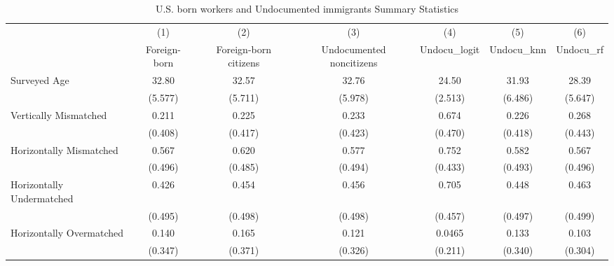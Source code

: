 \begin{table}[htbp]\centering
\def\sym#1{\ifmmode^{#1}\else\(^{#1}\)\fi}
\caption{U.S. born workers and Undocumented immigrants Summary Statistics \label{tab:sum}}
\begin{tabular}{l*{6}{c}}
\hline\hline
                    &\multicolumn{1}{c}{(1)}         &\multicolumn{1}{c}{(2)}         &\multicolumn{1}{c}{(3)}         &\multicolumn{1}{c}{(4)}         &\multicolumn{1}{c}{(5)}         &\multicolumn{1}{c}{(6)}         \\
                    &Foreign-born         &Foreign-born citizens         &Undocumented noncitizens         &Undocu\_logit         &  Undocu\_knn         &   Undocu\_rf         \\
\hline
Surveyed Age        &       32.80         &       32.57         &       32.76         &       24.50         &       31.93         &       28.39         \\
                    &     (5.577)         &     (5.711)         &     (5.978)         &     (2.513)         &     (6.486)         &     (5.647)         \\
[1em]
Vertically Mismatched&       0.211         &       0.225         &       0.233         &       0.674         &       0.226         &       0.268         \\
                    &     (0.408)         &     (0.417)         &     (0.423)         &     (0.470)         &     (0.418)         &     (0.443)         \\
[1em]
Horizontally Mismatched&       0.567         &       0.620         &       0.577         &       0.752         &       0.582         &       0.567         \\
                    &     (0.496)         &     (0.485)         &     (0.494)         &     (0.433)         &     (0.493)         &     (0.496)         \\
[1em]
Horizontally Undermatched&       0.426         &       0.454         &       0.456         &       0.705         &       0.448         &       0.463         \\
                    &     (0.495)         &     (0.498)         &     (0.498)         &     (0.457)         &     (0.497)         &     (0.499)         \\
[1em]
Horizontally Overmatched&       0.140         &       0.165         &       0.121         &      0.0465         &       0.133         &       0.103         \\
                    &     (0.347)         &     (0.371)         &     (0.326)         &     (0.211)         &     (0.340)         &     (0.304)         \\

\end{tabular}
\end{table}
